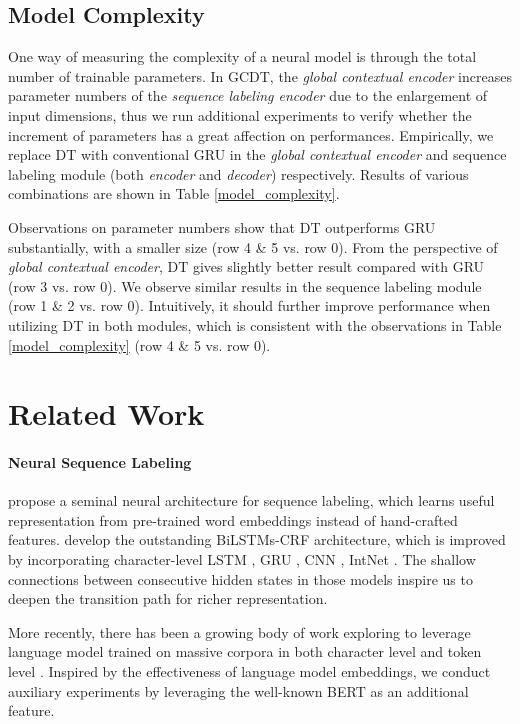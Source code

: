 \documentclass[11pt,a4paper]{article}
\begin{document}
\subsection{Model Complexity} \label{section_model_complexity}
One way of measuring the complexity of a neural model is through the total number of trainable parameters. In GCDT, the \emph{global contextual encoder} increases parameter numbers of the \emph{sequence labeling encoder} due to the enlargement of input dimensions, thus we run additional experiments to verify whether the increment of parameters has a great affection on performances. Empirically, we replace DT with conventional GRU in the \emph{global contextual encoder} and sequence labeling module (both \emph{encoder} and \emph{decoder}) respectively. Results of various combinations are shown in Table \ref{model_complexity}.

Observations on parameter numbers show that DT outperforms GRU substantially, with a smaller size (row 4 \& 5 vs. row 0). From the perspective of \emph{global contextual encoder}, DT gives slightly better result compared with GRU (row 3 vs. row 0). We observe similar results in the sequence labeling module (row 1 \& 2 vs. row 0). Intuitively, it should further improve performance when utilizing DT in both modules, which is consistent with the observations in Table \ref{model_complexity} (row 4 \& 5 vs. row 0).

\section{Related Work}

\paragraph{Neural Sequence Labeling}
\citeauthor{collobert2011}  propose a seminal neural architecture for sequence labeling, which learns useful representation from pre-trained word embeddings  instead of hand-crafted features.
\citeauthor{BLSTM+CRF}  develop the outstanding BiLSTMs-CRF architecture, which is improved by incorporating character-level LSTM \cite{char-LSTM+BLSTM+CRF}, GRU \cite{joint_Yang2016}, CNN \cite{first_CNN, deep_char_cnn}, IntNet \cite{deep_char_cnn}. 
The shallow connections between consecutive hidden states in those models inspire us to deepen the transition path for richer representation.

More recently, there has been a growing body of work exploring to leverage language model trained on massive corpora in both character level \cite{Peter2017,EMLo,contextual_emb} and token level \cite{BERT}. Inspired by the effectiveness of language model embeddings, we conduct auxiliary experiments by leveraging the well-known BERT as an additional feature. 
\end{document}
